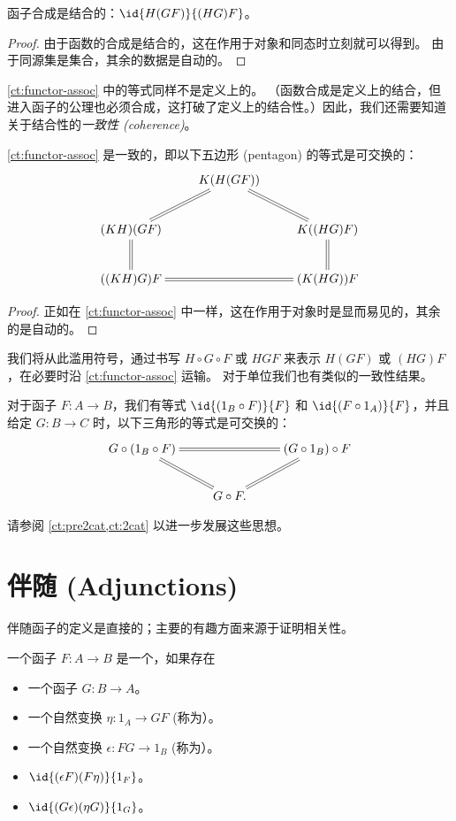 \begin{lem}\label{ct:functor-assoc}
函子合成是结合的：$\id{H(GF)}{(HG)F}$。
\end{lem}
\begin{proof}
  由于函数的合成是结合的，这在作用于对象和同态时立刻就可以得到。
  由于同源集是集合，其余的数据是自动的。
\end{proof}

\cref{ct:functor-assoc} 中的等式同样不是定义上的。
（函数合成是定义上的结合，但进入函子的公理也必须合成，这打破了定义上的结合性。）因此，我们还需要知道关于结合性的\emph{一致性 (coherence)}。

\begin{lem}\label{ct:pentagon}
\cref{ct:functor-assoc} 是一致的，即以下五边形 (pentagon) 的等式是可交换的：
\[ \xymatrix{ & K(H(GF)) \ar@{=}[dl] \ar@{=}[dr]\\
(KH)(GF) \ar@{=}[d] && K((HG)F) \ar@{=}[d]\\
  ((KH)G)F && (K(HG))F \ar@{=}[ll].}
\]
\end{lem}
\begin{proof}
  正如在 \cref{ct:functor-assoc} 中一样，这在作用于对象时是显而易见的，其余的是自动的。
\end{proof}

我们将从此滥用符号，通过书写 $H\circ G\circ F$ 或 $HGF$ 来表示 $H(GF)$ 或 $(HG)F$，在必要时沿 \cref{ct:functor-assoc} 运输。
对于单位我们也有类似的一致性结果。

\begin{lem}\label{ct:units}
对于函子 $F:A\to B$，我们有等式 $\id{(1_B\circ F)}{F}$ 和 $\id{(F\circ 1_A)}{F}$，并且给定 $G:B\to C$ 时，以下三角形的等式是可交换的：
\[ \xymatrix{
  G\circ (1_B \circ F) \ar@{=}[rr] \ar@{=}[dr] &&
  (G\circ 1_B)\circ F \ar@{=}[dl] \\
  & G \circ F.}
\]
\end{lem}

请参阅 \cref{ct:pre2cat,ct:2cat} 以进一步发展这些思想。


\section{伴随 (Adjunctions)}
\label{sec:adjunctions}

伴随函子的定义是直接的；主要的有趣方面来源于证明相关性。

\begin{defn}\label{ct:adjoints}
一个函子 $F:A\to B$ 是一个，如果存在
\begin{itemize}
  \item 一个函子 $G:B\to A$。
  \item 一个自然变换 $\eta:1_A \to GF$ (称为）。
  \item 一个自然变换 $\epsilon:FG\to 1_B$ (称为）。
  \item $\id{(\epsilon F)(F\eta)}{1_F}$。
  \item $\id{(G\epsilon)(\eta G)}{1_G}$。
\end{itemize}
\end{defn}

